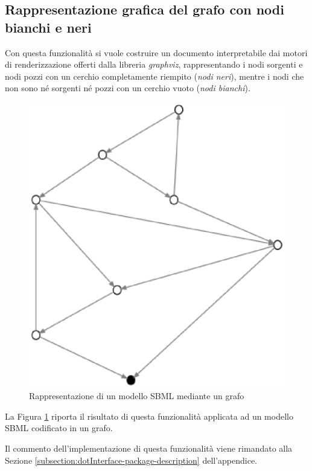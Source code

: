 \subsection{Rappresentazione grafica del grafo con nodi bianchi e
  neri}
\label{subsection:represent-it-in-black-and-white}
Con questa funzionalit\`a si vuole costruire un documento
interpretabile dai motori di renderizzazione offerti dalla libreria
\emph{graphviz}, rappresentando i nodi sorgenti e nodi pozzi con un
cerchio completamente riempito (\emph{nodi neri}), mentre i nodi che
non sono n\'e sorgenti n\'e pozzi con un cerchio vuoto (\emph{nodi
  bianchi}).
\begin{figure}
  \centering
  \includegraphics[scale=0.8]{images/applicationOfPrinterPipeFilterOnTarjanModel-phase-PrinterPipeFilter-level-0.eps}
  \caption{Rappresentazione di un modello SBML mediante un grafo}
  \label{fig:simple-black-and-white}
\end{figure}
La Figura \ref{fig:simple-black-and-white} riporta il risultato di
questa funzionalit\`a applicata ad un modello SBML codificato in un
grafo. 

Il commento dell'implementazione di questa funzionalit\`a viene
rimandato alla Sezione
\ref{subsection:dotInterface-package-description} dell'appendice.

